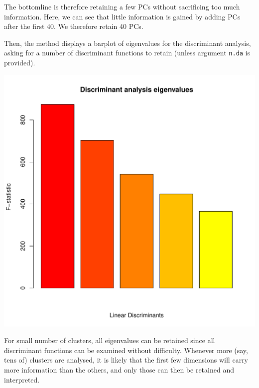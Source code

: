 \documentclass{article}
\begin{document}
\noindent The bottomline is therefore retaining a few PCs without sacrificing too much information.
Here, we can see that little information is gained by adding PCs after the first 40. We therefore
retain 40 PCs.

Then, the method displays a barplot of eigenvalues for the discriminant analysis, asking for a
number of discriminant functions to retain (unless argument \texttt{n.da} is provided).
\begin{center}
  \includegraphics[width=.7\textwidth]{eigen-dapc.pdf}
\end{center}

For small number of clusters, all eigenvalues can be retained since all discriminant functions can
be examined without difficulty. Whenever more (say, tens of) clusters are analysed,
it is likely that the first few dimensions will carry more information than the others, and only
those can then be retained and interpreted.
\\
\end{document}
